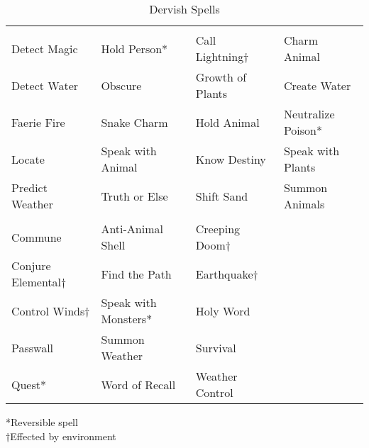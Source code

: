 \begin {table}[H]
  \caption{Dervish Spells}
  \begin{tabularx}{\columnwidth}{YYYY}
	 &  &  & \\
	Detect Magic & Hold Person* & Call Lightning† & Charm Animal\\
	Detect Water & Obscure & Growth of Plants & Create Water\\
	Faerie Fire & Snake Charm & Hold Animal & Neutralize Poison*\\
	Locate & Speak with Animal & Know Destiny & Speak with Plants\\
	Predict Weather & Truth or Else & Shift Sand & Summon Animals\\
	 &  & \\
	Commune & Anti-Animal Shell & Creeping Doom†\\
	Conjure Elemental† & Find the Path & Earthquake†\\
	Control Winds† & Speak with Monsters* & Holy Word\\
	Passwall & Summon Weather & Survival\\
	Quest* & Word of Recall & Weather Control\
  \end {tabularx}
	*Reversible spell\\
	†Effected by environment
\end {table}

